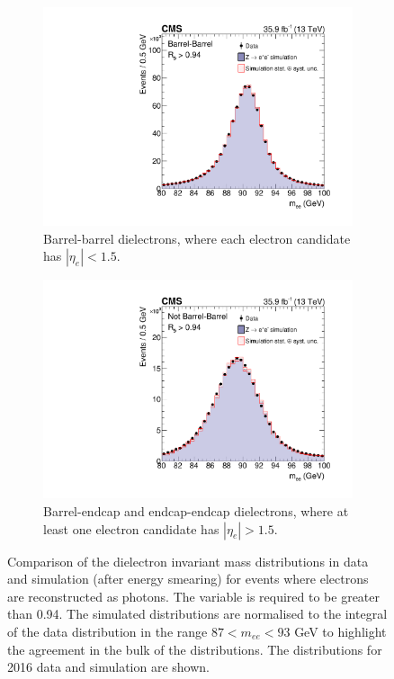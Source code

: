 \begin{figure}[h!]
  \centering
  \begin{subfigure}{0.49\textwidth}
    \includegraphics[width=\textwidth]{Figures/Objects/meeBarrel_2016}
    \caption{Barrel-barrel dielectrons, 
    where each electron candidate has $|\eta_e|<1.5$.}
    \label{fig:obj_meeBarrel_2016}
  \end{subfigure}
  \begin{subfigure}{0.49\textwidth}
    \includegraphics[width=\textwidth]{Figures/Objects/meeEndcap_2016}
    \caption{Barrel-endcap and endcap-endcap dielectrons,
    where at least one electron candidate has $|\eta_e|>1.5$.}
    \label{fig:obj_meeEndcap_2016}
  \end{subfigure}
  \caption{Comparison of the dielectron invariant mass distributions in data and simulation
  (after energy smearing) for \Zee
  events where electrons are reconstructed as photons.
  The \RNINE variable is required to be greater than 0.94.
  The simulated distributions are
  normalised to the integral of the data distribution in the range $87 < m_{ee} < 93$ GeV to highlight
  the agreement in the bulk of the distributions.
  The distributions for 2016 data and simulation are shown.}
  \label{fig:obj_mee_2016}
\end{figure}

